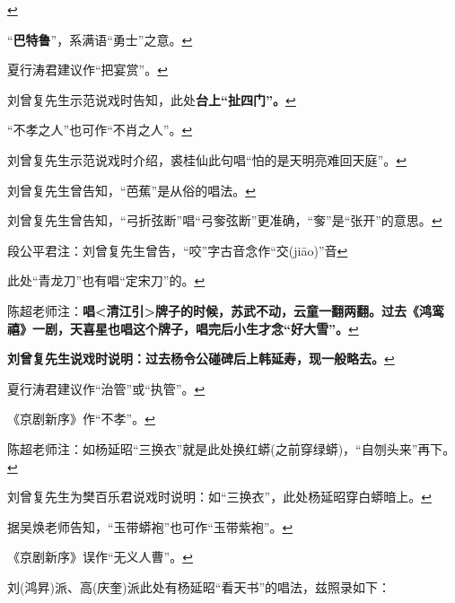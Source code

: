   \protect\hyperlink{fnref445}{↩}
\item
  \leavevmode\hypertarget{fn446}{}%
  ``\textbf{巴特鲁}''，系满语``勇士''之意。\protect\hyperlink{fnref446}{↩}
\item
  \leavevmode\hypertarget{fn447}{}%
  夏行涛君建议作``把宴赏''。\protect\hyperlink{fnref447}{↩}
\item
  \leavevmode\hypertarget{fn448}{}%
  刘曾复先生示范说戏时告知，此处\textbf{台上``扯四门''。}\protect\hyperlink{fnref448}{↩}
\item
  \leavevmode\hypertarget{fn449}{}%
  ``不孝之人''也可作``不肖之人''。\protect\hyperlink{fnref449}{↩}
\item
  \leavevmode\hypertarget{fn450}{}%
  刘曾复先生示范说戏时介绍，裘桂仙此句唱``怕的是天明亮难回天庭''。\protect\hyperlink{fnref450}{↩}
\item
  \leavevmode\hypertarget{fn451}{}%
  刘曾复先生曾告知，``芭蕉''是从俗的唱法。\protect\hyperlink{fnref451}{↩}
\item
  \leavevmode\hypertarget{fn452}{}%
  刘曾复先生曾告知，``弓折弦断''唱``弓奓弦断''更准确，``奓''是``张开''的意思。\protect\hyperlink{fnref452}{↩}
\item
  \leavevmode\hypertarget{fn453}{}%
  段公平君注：刘曾复先生曾告，``咬''字古音念作``交(jiāo)''音\protect\hyperlink{fnref453}{↩}
\item
  \leavevmode\hypertarget{fn454}{}%
  此处``青龙刀''也有唱``定宋刀''的。\protect\hyperlink{fnref454}{↩}
\item
  \leavevmode\hypertarget{fn455}{}%
  陈超老师注：\textbf{唱\textless{}清江引\textgreater{}牌子的时候，苏武不动，云童一翻两翻。过去《鸿鸾禧》一剧，天喜星也唱这个牌子，唱完后小生才念``好大雪''。}\protect\hyperlink{fnref455}{↩}
\item
  \leavevmode\hypertarget{fn456}{}%
  \textbf{刘曾复先生说戏时说明：过去杨令公碰碑后上韩延寿，现一般略去。}\protect\hyperlink{fnref456}{↩}
\item
  \leavevmode\hypertarget{fn457}{}%
  夏行涛君建议作``治管''或``执管''。\protect\hyperlink{fnref457}{↩}
\item
  \leavevmode\hypertarget{fn458}{}%
  《京剧新序》作``不孝''。\protect\hyperlink{fnref458}{↩}
\item
  \leavevmode\hypertarget{fn459}{}%
  陈超老师注：如杨延昭``三换衣''就是此处换红蟒(之前穿绿蟒)，``自刎头来''再下。\protect\hyperlink{fnref459}{↩}
\item
  \leavevmode\hypertarget{fn460}{}%
  刘曾复先生为樊百乐君说戏时说明：如``三换衣''，此处杨延昭穿白蟒暗上。\protect\hyperlink{fnref460}{↩}
\item
  \leavevmode\hypertarget{fn461}{}%
  据吴焕老师告知，``玉带蟒袍''也可作``玉带紫袍''。\protect\hyperlink{fnref461}{↩}
\item
  \leavevmode\hypertarget{fn462}{}%
  《京剧新序》误作``无义人曹''。\protect\hyperlink{fnref462}{↩}
\item
  \leavevmode\hypertarget{fn463}{}%
  刘(鸿昇)派、高(庆奎)派此处有杨延昭``看天书''的唱法，兹照录如下：

